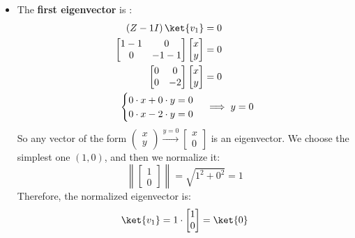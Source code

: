 \begin{itemize}
    \item The \textbf{first eigenvector}  is :
    \begin{align*}
        \left(Z - 1 I\right)\ket{v_1} &= 0 \\
        \begin{bmatrix}
            1 - 1 & 0 \\
            0 & -1 - 1
        \end{bmatrix}
        \begin{bmatrix}
            x \\
            y
        \end{bmatrix} &= 0 \\
        \begin{bmatrix}
            0 & 0 \\
            0 & -2
        \end{bmatrix}
        \begin{bmatrix}
            x \\
            y
        \end{bmatrix} &= 0 \\
        \begin{cases}
            0 \cdot x + 0 \cdot y = 0 \\
            0 \cdot x - 2 \cdot y = 0
        \end{cases} &\implies
        y = 0
    \end{align*}
    So any vector of the form $\begin{pmatrix}
        x \\
        y
    \end{pmatrix} \xrightarrow{y=0} \begin{bmatrix}
        x \\
        0
    \end{bmatrix}$ is an eigenvector. We choose the simplest one $\left(1, 0\right)$, and then we normalize it:
    \begin{equation*}
        \left\|\begin{bmatrix}
            1 \\
            0
        \end{bmatrix}\right\| = \sqrt{1^2 + 0^2} = 1
    \end{equation*}
    Therefore, the normalized eigenvector is:
    \begin{equation*}
        \ket{v_1} = 1 \cdot \begin{bmatrix}
            1 \\
            0
        \end{bmatrix} = \ket{0}
    \end{equation*}


\end{itemize}

